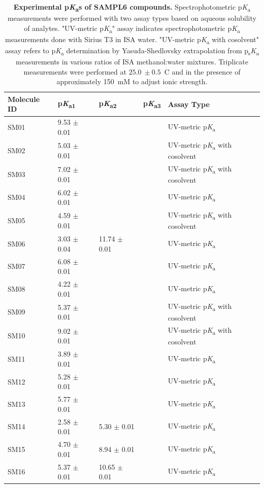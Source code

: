 \documentclass[9pt,lineno]{elife}
\newcommand{\pKa}{p\textit{K}\textsubscript{a}}
\newcommand{\psKa}{p\textsubscript{s}\textit{K}\textsubscript{a}}
\begin{document}
\begin{table}[tb!]
\begin{center}
\begin{threeparttable}
\centering
\caption{{\bf Experimental \pKa{}s of SAMPL6 compounds.} 
Spectrophotometric \pKa{} measurements were performed with two assay types based on aqueous solubility of analytes. "UV-metric \pKa" assay indicates spectrophotometric \pKa{} measurements done with Sirius T3 in ISA water. 
"UV-metric \pKa{} with cosolvent" assay refers to \pKa{} determination by Yasuda-Shedlovsky extrapolation from \psKa{} measurements in various ratios of ISA methanol:water mixtures. Triplicate measurements were performed at $25.0~\pm 0.5$\textdegree~C and in the presence of approximately 150~mM  to adjust ionic strength.} 
\label{UV-metric_pKa_table}
\begin{tabular}{@{}lllll@{}}
\toprule
{\bf Molecule ID} & {\bf \pKa \textsubscript{1}} & {\bf \pKa \textsubscript{2}} & {\bf \pKa \textsubscript{3}} & {\bf Assay Type} \\ \midrule
SM01 & 9.53 $\pm$ 0.01 &  &  & UV-metric \pKa{} \\
SM02 & 5.03 $\pm$ 0.01 &  &  & UV-metric \pKa{} with cosolvent \\
SM03 & 7.02 $\pm$ 0.01 &  &  & UV-metric \pKa{} with cosolvent \\
SM04 & 6.02 $\pm$ 0.01 &  &  & UV-metric \pKa{} \\
SM05 & 4.59 $\pm$ 0.01 &  &  & UV-metric \pKa{} with cosolvent \\
SM06 & 3.03 $\pm$ 0.04 & 11.74 $\pm$ 0.01 &  & UV-metric \pKa{} \\
SM07 & 6.08 $\pm$ 0.01 &  &  & UV-metric \pKa{} \\
SM08 & 4.22 $\pm$ 0.01 &  &  & UV-metric \pKa{} \\
SM09 & 5.37 $\pm$ 0.01 &  &  & UV-metric \pKa{} with cosolvent \\
SM10 & 9.02 $\pm$ 0.01 &  &  & UV-metric \pKa{} with cosolvent \\
SM11 & 3.89 $\pm$ 0.01 &  &  & UV-metric \pKa{} \\
SM12 & 5.28 $\pm$ 0.01 &  &  & UV-metric \pKa{} \\
SM13 & 5.77 $\pm$ 0.01 &  &  & UV-metric \pKa{} \\
SM14 & 2.58 $\pm$ 0.01 & 5.30 $\pm$ 0.01 &  & UV-metric \pKa{} \\
SM15 & 4.70 $\pm$ 0.01 & 8.94 $\pm$ 0.01 &  & UV-metric \pKa{} \\
SM16 & 5.37 $\pm$ 0.01 & 10.65 $\pm$ 0.01 &  & UV-metric \pKa{} \\

\end{tabular}
\end{threeparttable}
\end{center}
\end{table}
\end{document}
